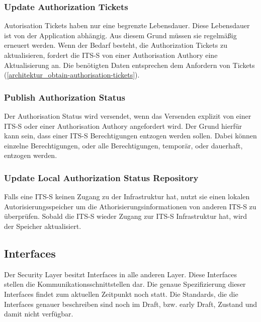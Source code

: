 \subsubsection{Update Authorization Tickets}
Autorisation Tickets haben nur eine begrenzte Lebensdauer. Diese Lebensdauer ist von der Application abhängig. Aus diesem Grund müssen sie regelmäßig erneuert werden. Wenn der Bedarf besteht, die Authorization Tickets zu aktualisieren, fordert die \ac{ITS-S} von einer Authorisation Authory eine Aktualisierung an. Die benötigten Daten entsprechen dem Anfordern von Tickets (\autoref{architektur_obtain-authorisation-tickets}).

\subsubsection{Publish Authorization Status}
Der Authorisation Status wird versendet, wenn das Versenden explizit von einer \ac{ITS-S} oder einer Authorisation Authory angefordert wird. Der Grund hierfür kann sein, dass einer \ac{ITS-S} Berechtigungen entzogen werden sollen. Dabei können einzelne Berechtigungen, oder alle Berechtigungen, temporär, oder dauerhaft, entzogen werden.

\subsubsection{Update Local Authorization Status Repository}
Falls eine \ac{ITS-S} keinen Zugang zu der Infrastruktur hat, nutzt sie einen lokalen Autorisierungsspeicher um die Athorisierungsinformationen von anderen \ac{ITS-S} zu überprüfen. Sobald die \ac{ITS-S} wieder Zugang zur \ac{ITS-S} Infrastruktur hat, wird der Speicher aktualisiert.  

\subsection{Interfaces}
Der Security Layer besitzt Interfaces in alle anderen Layer. Diese Interfaces stellen die Kommunikationsschnittstellen dar. Die genaue Spezifizierung dieser Interfaces findet zum aktuellen Zeitpunkt noch statt. Die Standards, die die  Interfaces genauer beschreiben sind noch im  \glqq Draft\grqq , bzw. \glqq early Draft\grqq , Zustand und damit nicht ver\-füg\-bar. 


